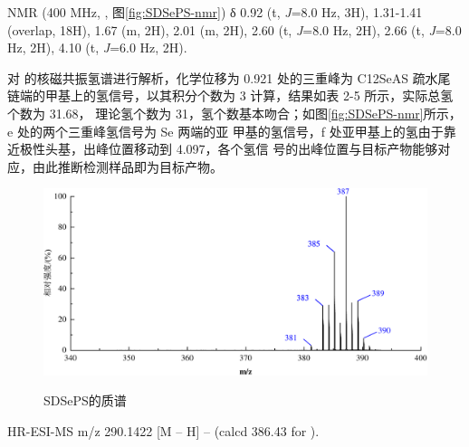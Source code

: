 \documentclass[bachelor,fandolfonts,replaceperiod]{jnuthesis}
\begin{document}
     NMR (400 MHz, , 图\ref{fig:SDSePS-nmr}) δ 0.92 (t, \textit{J}=8.0 Hz, 3H), 1.31-1.41 (overlap, 18H), 
    1.67 (m, 2H), 2.01 (m, 2H), 2.60 (t, \textit{J}=8.0 Hz, 2H), 2.66 (t, \textit{J}=8.0 Hz, 2H),  4.10 (t, \textit{J}=6.0 Hz, 2H).
    
    对  的核磁共振氢谱进行解析，化学位移为 0.921 处的三重峰为 C12SeAS 疏水尾
    链端的甲基上的氢信号，以其积分个数为 3 计算，结果如表 2-5 所示，实际总氢个数为 31.68，
    理论氢个数为 31，氢个数基本吻合；如图\ref{fig:SDSePS-nmr}所示，e 处的两个三重峰氢信号为 Se 两端的亚
    甲基的氢信号，f 处亚甲基上的氢由于靠近极性头基，出峰位置移动到 4.097，各个氢信
    号的出峰位置与目标产物能够对应，由此推断检测样品即为目标产物。
     \begin{figure}[H]
        \centering
        \includegraphics[width=.8\textwidth]{figure/SDSePS-mass.pdf}\\
        \caption{SDSePS的质谱}\label{fig:SDSePS-mass}
    \end{figure}

HR-ESI-MS m/z 290.1422 [M – H] – (calcd 386.43 for ).
%
    
\end{document}
